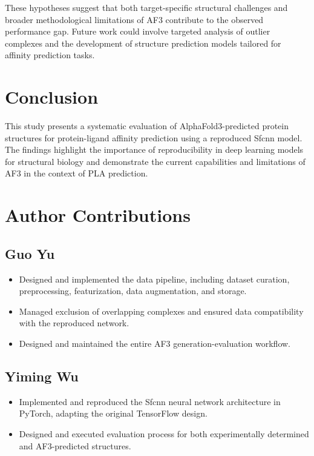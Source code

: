 \documentclass[unnumsec,webpdf,contemporary,large]{oup-authoring-template}
\theoremstyle{thmstyleone}%
\theoremstyle{thmstyletwo}%
\theoremstyle{thmstylethree}%
\begin{document}
These hypotheses suggest that both target-specific structural challenges and broader methodological limitations of AF3 contribute to the observed performance gap. Future work could involve targeted analysis of outlier complexes and the development of structure prediction models tailored for affinity prediction tasks.

\section{Conclusion}
This study presents a systematic evaluation of AlphaFold3-predicted protein structures 
for protein-ligand affinity prediction using a reproduced Sfcnn model. 
The findings highlight the importance of reproducibility in deep learning models for 
structural biology and demonstrate the current capabilities and limitations of AF3 in 
the context of PLA prediction. 


\section{Author Contributions}

\subsection{Guo Yu}
\begin{itemize}
    \item Designed and implemented the data pipeline, including dataset curation, preprocessing, featurization, data augmentation, and storage.
    \item Managed exclusion of overlapping complexes and ensured data compatibility with the reproduced network.
    \item Designed and maintained the entire AF3 generation-evaluation workflow.
\end{itemize}

\subsection{Yiming Wu}
\begin{itemize}
    \item Implemented and reproduced the Sfcnn neural network architecture in PyTorch, adapting the original TensorFlow design.
    \item Designed and executed evaluation process for both experimentally determined and AF3-predicted structures.
\end{itemize}
\end{document}

